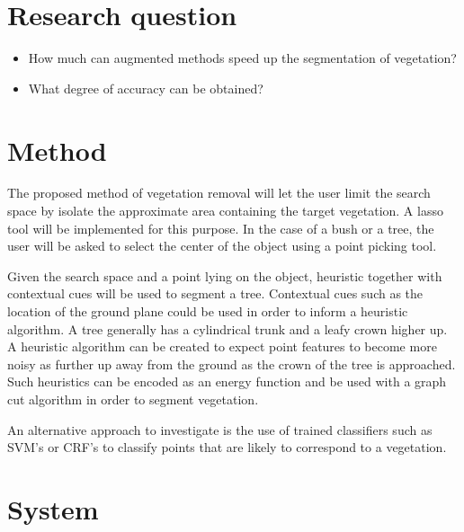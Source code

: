 \documentclass[10pt,twocolumn]{article}
\begin{document}


\section{Research question}
\begin{itemize}
\item How much can augmented methods speed up the segmentation of vegetation?
\item What degree of accuracy can be obtained?
\end{itemize}

\section{Method}
The proposed method of vegetation removal will let the user limit the search space by isolate the approximate area containing the target vegetation. A lasso tool will be implemented for this purpose. In the case of a bush or a tree, the user will be asked to select the center of the object using a point picking tool. 

Given the search space and a point lying on the object, heuristic together with contextual cues will be used to segment a tree. Contextual cues such as the location of the ground plane could be used in order to inform a heuristic algorithm. A tree generally has a cylindrical trunk and a leafy crown higher up. A heuristic algorithm can be created to expect point features to become more noisy as further up away from the ground as the crown of the tree is approached. Such heuristics can be encoded as an energy function and be used with a graph cut algorithm in order to segment vegetation.

An alternative approach to investigate is the use of trained classifiers such as SVM's or CRF's to classify points that are likely to correspond to a vegetation.


\section{System}
\end{document}
